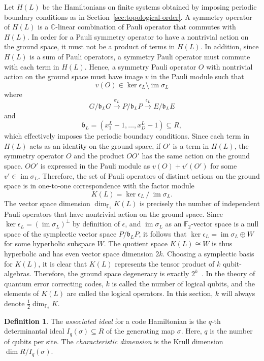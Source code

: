 \documentclass[letterpaper,12pt]{amsart}
\theoremstyle{definition} \newtheorem{defn}{Definition}
\theoremstyle{definition} \newtheorem{rem}{Remark}
\theoremstyle{definition} \newtheorem{example}{Example}
\newcommand{\im}{\mathop{\mathrm{im}}}
\newcommand{\FF}{\mathbb{F}}
\newcommand{\bb}{\mathfrak{b}}
\begin{document}
Let $H(L)$ be the Hamiltonians on finite systems
obtained by imposing periodic boundary conditions 
as in Section~\ref{sec:topological-order}.
A symmetry operator of $H(L)$ is 
a $\mathbb{C}$-linear combination of Pauli operator that commutes with $H(L)$.
In order for a Pauli symmetry operator
to have a nontrivial action on the ground space,
it must not be a product of terms in $H(L)$.
In addition, since $H(L)$ is a sum of Pauli operators,
a symmetry Pauli operator must commute with each term in $H(L)$.
Hence, a symmetry Pauli operator $O$ with nontrivial action on the ground space
must have image $v$ in the Pauli module such that
\[
 v(O) \in \ker \epsilon_L \setminus \im \sigma_L
\]
where
\[
 G / \bb_L G \xrightarrow{ \sigma_L } P / \bb_L P \xrightarrow{ \epsilon_L } E / \bb_L E 
\]
and
\[
 \bb_L = (x^L_1 -1,\ldots, x^L_D -1) \subseteq R, 
\]
which effectively imposes the periodic boundary conditions.
Since each term in $H(L)$ acts as an identity on the ground space,
if $O'$ is a term in $H(L)$, the symmetry operator $O$ and the product $OO'$
has the same action on the ground space. 
$OO'$ is expressed in the Pauli module as $v(O) + v'(O')$ for some $v' \in \im \sigma_L$.
Therefore, the set of Pauli operators of distinct actions on the ground space is
in one-to-one correspondence with the factor module
\[
 K(L) = \ker \epsilon_L ~/~ \im \sigma_L .
\] %
The vector space dimension $\dim_{\FF_2} K(L)$ is precisely
the number of independent Pauli operators that have nontrivial action on the ground space.
%
Since $\ker \epsilon_L = (\im \sigma_L)^\perp$ by definition of $\epsilon$,
and $\im \sigma_L$ as an $\FF_2$-vector space is a null space of the symplectic vector space $P/\bb_L P$,
it follows that $\ker \epsilon_L = \im \sigma_L \oplus W$ for some hyperbolic subspace $W$.
The quotient space $K(L) \cong W$ is thus hyperbolic and has even vector space dimension $2k$.
Choosing a symplectic basis for $K(L)$, 
it is clear that $K(L)$ represents the tensor product of $k$ qubit-algebras.
Therefore, the ground space degeneracy is exactly $2^k$~\cite{Gottesman1996Saturating,CalderbankRainsShorEtAl1997Quantum}.
In the theory of quantum error correcting codes,
$k$ is called the number of logical qubits,
and the elements of $K(L)$ are called the logical operators.
In this section, $k$ will always denote $\frac{1}{2} \dim_{\FF_2} K$.

\begin{defn}
The {\em associated ideal} for a code Hamiltonian
is the $q$-th determinantal ideal $I_q(\sigma) \subseteq R$
of the generating map $\sigma$.
Here, $q$ is the number of qubits per site.
The {\em characteristic dimension} is the Krull dimension $\dim R / I_q(\sigma)$.
\end{defn}
\end{document}
